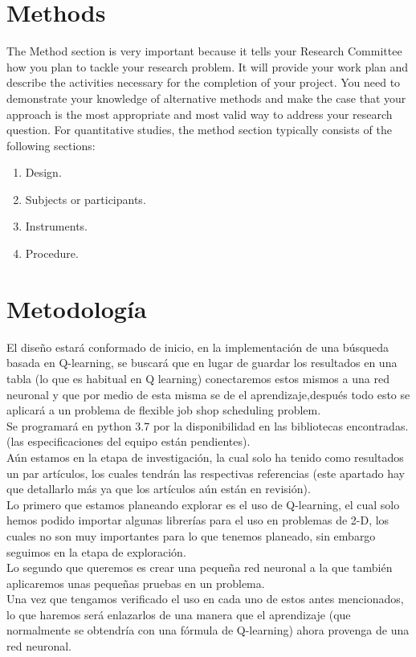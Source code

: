 \documentclass[a4paper, 12pt]{article}
\begin{document}
\section{Methods}
The Method section is very important because it tells your Research Committee how
you plan to tackle your research problem. It will provide your work plan and describe
the activities necessary for the completion of your project.
You need to demonstrate your knowledge of alternative methods and make the case
that your approach is the most appropriate and most valid way to address your
research question. \newline
For quantitative studies, the method section typically consists of the following
sections:
\begin{enumerate}
	\item Design.
	\item Subjects or participants.
	\item Instruments.
	\item Procedure.
\end{enumerate}

\section{Metodología}
El diseño estará conformado de inicio, en la implementación de una búsqueda basada en Q-learning, se buscará que en lugar de guardar los resultados en una tabla (lo que es habitual en Q learning) conectaremos estos mismos a  una red neuronal y que por medio de esta misma se de el aprendizaje,después todo esto se aplicará a un problema de flexible job shop scheduling problem. \\
Se programará en python 3.7 por la disponibilidad en las bibliotecas encontradas. (las especificaciones del equipo están pendientes).
\\ Aún estamos en la etapa de investigación, la cual solo ha tenido como resultados un par artículos, los cuales tendrán las respectivas referencias (este apartado hay que detallarlo más ya que los artículos aún están en revisión).
\\ Lo primero que estamos planeando explorar es el uso de Q-learning, el cual solo hemos podido importar algunas librerías para el uso en problemas de 2-D, los cuales no son muy importantes para lo que tenemos planeado, sin embargo seguimos en la etapa de exploración.
\\ Lo segundo que queremos es crear una pequeña red neuronal a la que también aplicaremos unas pequeñas pruebas en un problema.
\\ Una vez que tengamos verificado el uso en cada uno de estos antes  mencionados, lo que haremos será enlazarlos de una manera que el aprendizaje (que normalmente se obtendría con una fórmula de Q-learning) ahora provenga de una red neuronal. \\ 
\end{document}
